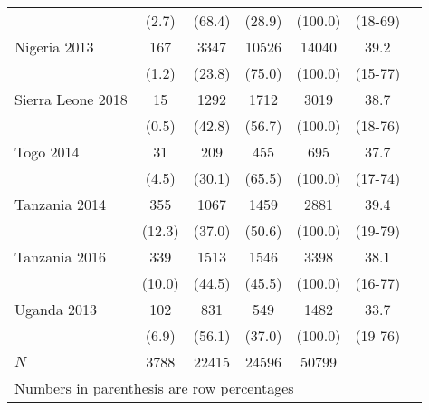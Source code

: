 \begin{tabular}{l*{6}{c}}
&                                              {(2.7)}&      {(68.4)}&             {(28.9)}&     {(100.0)}&       {(18-69)}\\
Nigeria 2013&                  {167}&                {3347}&           {10526}&       {14040}&         {39.2}\\
&                                              {(1.2)}&      {(23.8)}&             {(75.0)}&     {(100.0)}&       {(15-77)}\\
Sierra Leone 2018&             {15}&                {1292}&           {1712}&       {3019}&         {38.7}\\
&                                              {(0.5)}&      {(42.8)}&             {(56.7)}&     {(100.0)}&       {(18-76)}\\
Togo 2014&                             {31}&               {209}&           {455}&       {695}&         {37.7}\\
&                                              {(4.5)}&     {(30.1)}&             {(65.5)}&     {(100.0)}&       {(17-74)}\\
Tanzania 2014&                 {355}&               {1067}&           {1459}&       {2881}&         {39.4}\\
&                                              {(12.3)}&     {(37.0)}&             {(50.6)}&     {(100.0)}&       {(19-79)}\\
Tanzania 2016&                 {339}&               {1513}&           {1546}&       {3398}&         {38.1}\\
&                                              {(10.0)}&     {(44.5)}&             {(45.5)}&     {(100.0)}&       {(16-77)}\\
Uganda 2013&                   {102}&               {831}&           {549}&       {1482}&         {33.7}\\
&                                              {(6.9)}&     {(56.1)}&             {(37.0)}&     {(100.0)}&       {(19-76)}\\
\hline
\(N\)                          &       {3788}                &  {22415} &    {24596} &         {50799}\\
\hline\hline
\multicolumn{6}{l}{\footnotesize Numbers in parenthesis are row percentages}\\
\end{tabular}